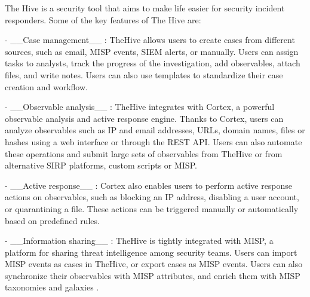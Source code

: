 
The Hive is a security tool that aims to make life easier for security incident responders. Some of the key features of The Hive are:
\begin{markdown}
- __Case management__ : TheHive allows users to create cases from different sources, such as email, MISP events, SIEM alerts, or manually. Users can assign tasks to analysts, track the progress of the investigation, add observables, attach files, and write notes. Users can also use templates to standardize their case creation and workflow.

- __Observable analysis__ : TheHive integrates with Cortex, a powerful observable analysis and active response engine. Thanks to Cortex, users can analyze observables such as IP and email addresses, URLs, domain names, files or hashes using a web interface or through the REST API. Users can also automate these operations and submit large sets of observables from TheHive or from alternative SIRP platforms, custom scripts or MISP.

- __Active response__ : Cortex also enables users to perform active response actions on observables, such as blocking an IP address, disabling a user account, or quarantining a file. These actions can be triggered manually or automatically based on predefined rules.

- __Information sharing__ : TheHive is tightly integrated with MISP, a platform for sharing threat intelligence among security teams. Users can import MISP events as cases in TheHive, or export cases as MISP events. Users can also synchronize their observables with MISP attributes, and enrich them with MISP taxonomies and galaxies .
\end{markdown}




